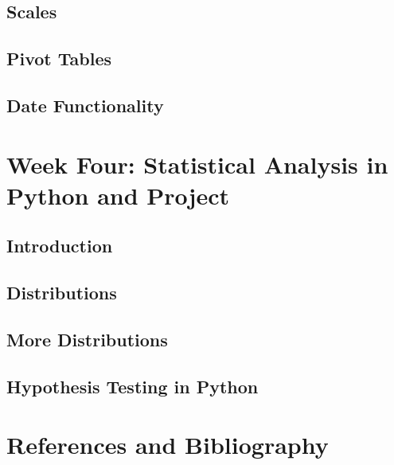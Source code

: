 \documentclass[11pt]{article}
\begin{document}
    \subsection{Scales}
    \subsection{Pivot Tables}
    \subsection{Date Functionality}




\newpage
\section{Week Four: Statistical Analysis in Python and Project}
    \subsection{Introduction}
    \subsection{Distributions}
    \subsection{More Distributions}
    \subsection{Hypothesis Testing in Python}



















\section{References and Bibliography}






\end{document}
